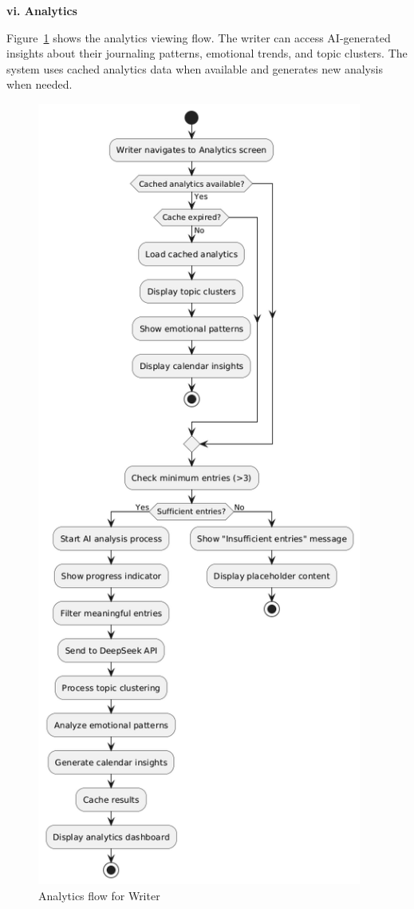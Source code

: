 \textbf{vi. Analytics}


Figure~\ref{fig:analytics-flow} shows the analytics viewing flow. The writer can access AI-generated insights about their journaling patterns, emotional trends, and topic clusters. The system uses cached analytics data when available and generates new analysis when needed.

\begin{figure}[H]
\centering
\includegraphics[width=0.95\textwidth,height=0.7\textheight,keepaspectratio]{files/imgs/analytics_flow.png}
\caption{Analytics flow for Writer}
\label{fig:analytics-flow}
\end{figure}
\clearpage

